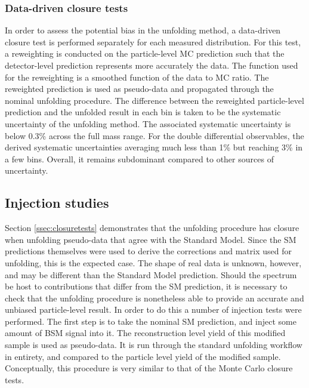 \subsubsection{Data-driven closure tests}
\label{sssec:datadrivenclosure}
In order to assess the potential bias in the unfolding method, a data-driven closure test is performed separately for each measured distribution. For this test, a reweighting is conducted on the particle-level MC prediction such that the detector-level prediction represents more accurately the data. The function used for the reweighting is a smoothed function of the data to MC ratio. The reweighted prediction is used as pseudo-data and propagated through the nominal unfolding procedure. The difference between the reweighted particle-level prediction and the unfolded result in each bin is taken to be the systematic uncertainty of the unfolding method. The associated systematic uncertainty is below 0.3\% across the full mass range. For the double differential observables, the derived systematic uncertainties averaging much less than 1\% but reaching 3\% in a few bins. Overall, it remains subdominant compared to other sources of uncertainty.

\subsection{Injection studies}
\label{ssec:injectiontests}
Section \ref{ssec:closuretests} demonstrates that the unfolding procedure has closure when unfolding pseudo-data that agree with the Standard Model. Since the SM predictions themselves were used to derive the corrections and matrix used for unfolding, this is the expected case. The shape of real data is unknown, however, and may be different than the Standard Model prediction. Should the \mFourL{} spectrum be host to contributions that differ from the SM prediction, it is necessary to check that the unfolding procedure is nonetheless able to provide an accurate and unbiased particle-level result. In order to do this a number of injection tests were performed. The first step is to take the nominal SM prediction, and inject some amount of BSM signal into it. The reconstruction level yield of this modified sample is used as pseudo-data. It is run through the standard unfolding workflow in entirety, and compared to the particle level yield of the modified sample. Conceptually, this procedure is very similar to that of the Monte Carlo closure tests. 

